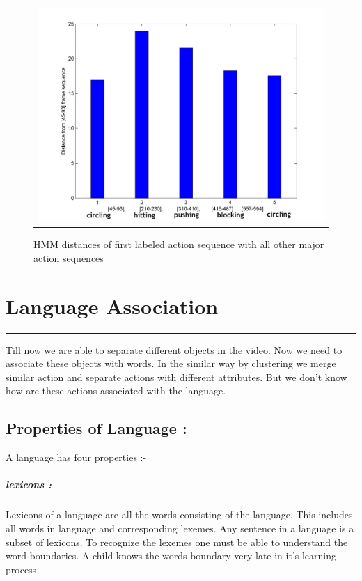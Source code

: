 \def\DevnagVersion{2.15}\documentclass[a4paper, 11pt, notitlepage]{report}
\begin{document}
\begin{figure}[h]
\center
\begin{tabular}{c}
\includegraphics[scale=0.2]{barplot1.jpg}
\end{tabular}
\label{tab:gt}
\caption{HMM distances of first labeled action sequence with all other major action sequences}
\end{figure} 

\chapter{Language Association } 
\hrule height 2pt
\vspace*{10pt} 

 Till now we are able to separate different objects in the video. Now we need to associate these objects with words. In the similar way by clustering we merge similar action and separate actions with different attributes. But we don't know how are these actions associated with the language.\\
 \hspace*{10pt} \section{Properties of Language :}
 A language has four properties :-
 \paragraph{lexicons : }
  Lexicons of a language are all the words consisting of the language. This includes all words in language and corresponding lexemes. Any sentence in a language is a subset of lexicons. To recognize the lexemes one must be able to understand the word boundaries. A child knows the words boundary very late in it's learning process\\
\end{document}
